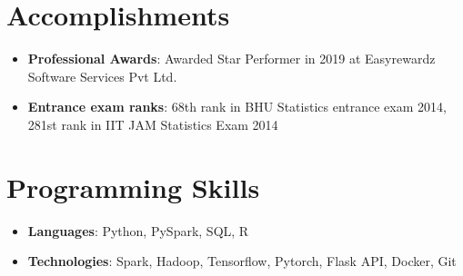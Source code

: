 \documentclass[letterpaper,11pt]{article}
\newcommand{\resumeItem}[2]{
  \item\small{
    \textbf{#1}{: #2 \vspace{-2pt}}
  }
}
\newcommand{\resumeSubItem}[2]{\resumeItem{#1}{#2}\vspace{-4pt}}
\newcommand{\resumeSubHeadingListStart}{\begin{itemize}[leftmargin=*]}
\newcommand{\resumeSubHeadingListEnd}{\end{itemize}}
\begin{document}
%

\section{Accomplishments}
  \resumeSubHeadingListStart
    \resumeSubItem{Professional Awards}
      {Awarded Star Performer in 2019 at Easyrewardz Software Services Pvt Ltd.}
    \resumeSubItem{Entrance exam ranks}
      {68th rank in BHU Statistics entrance exam 2014, 281st rank in IIT JAM Statistics Exam 2014\vspace{-12pt}}  
  \resumeSubHeadingListEnd
%


\section{Programming Skills}
  \resumeSubHeadingListStart
    \resumeSubItem
      {Languages}{Python, PySpark, SQL, R}
    \resumeSubItem  
      {Technologies}{Spark, Hadoop, Tensorflow, Pytorch, Flask API, Docker, Git}
  \resumeSubHeadingListEnd


\end{document}
